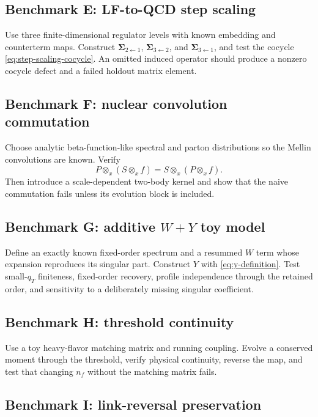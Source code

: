 \documentclass[11pt]{article}
\newcommand{\otimesx}{\mathop{\otimes}_{x}}
\begin{document}
\subsection{Benchmark E: LF-to-QCD step scaling}

Use three finite-dimensional regulator levels with known embedding and
counterterm maps.  Construct \(\bm\Sigma_{2\leftarrow1}\),
\(\bm\Sigma_{3\leftarrow2}\), and \(\bm\Sigma_{3\leftarrow1}\), and test the
cocycle \cref{eq:step-scaling-cocycle}.  An omitted induced operator should
produce a nonzero cocycle defect and a failed holdout matrix element.

\subsection{Benchmark F: nuclear convolution commutation}

Choose analytic beta-function-like spectral and parton distributions so the
Mellin convolutions are known.  Verify
\begin{equation}
 P\otimesx(S\otimesx f)=S\otimesx(P\otimesx f).
 \label{eq:analytic-nuclear-associativity}
\end{equation}
Then introduce a scale-dependent two-body kernel and show that the naive
commutation fails unless its evolution block is included.

\subsection{Benchmark G: additive \texorpdfstring{\(W+Y\)}{W+Y} toy model}

Define an exactly known fixed-order spectrum and a resummed \(W\) term whose
expansion reproduces its singular part.  Construct \(Y\) with
\cref{eq:y-definition}.  Test small-\(q_T\) finiteness, fixed-order recovery,
profile independence through the retained order, and sensitivity to a
deliberately missing singular coefficient.

\subsection{Benchmark H: threshold continuity}

Use a toy heavy-flavor matching matrix and running coupling.  Evolve a
conserved moment through the threshold, verify physical continuity, reverse
the map, and test that changing \(n_f\) without the matching matrix fails.

\subsection{Benchmark I: link-reversal preservation}
\end{document}
